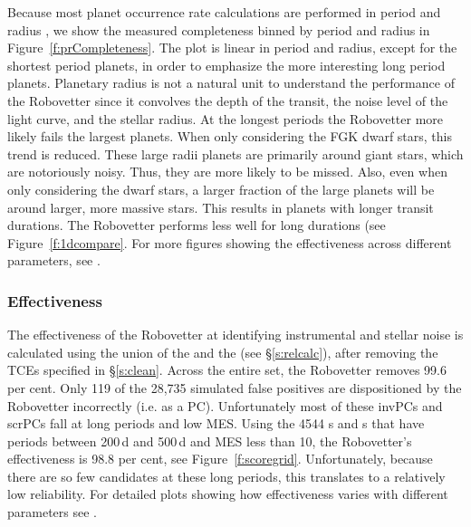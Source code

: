 Because most planet occurrence rate calculations are performed in period and radius \citep[e.g.][]{Burke2015}, we show the measured completeness binned by period and radius in Figure~\ref{f:prCompleteness}. The plot is linear in period and radius, except for the shortest period planets, in order to emphasize the more interesting long period planets. Planetary radius is not a natural unit to understand the performance of the Robovetter since it convolves the depth of the transit, the noise level of the light curve, and the stellar radius.  At the longest periods the Robovetter more likely fails the largest planets.  When only considering the FGK dwarf stars, this trend is reduced.  These large radii planets are primarily around giant stars, which are notoriously noisy. Thus, they are more likely to be missed. Also, even when only considering the dwarf stars, a larger fraction of the large planets will be around larger, more massive stars. This results in planets with longer transit durations. The Robovetter performs less well for long durations (see Figure~\ref{f:1dcompare}. For more figures showing the effectiveness across different parameters, see \citet{Coughlin2017detmetrics}.


\subsubsection{Effectiveness}
The effectiveness of the Robovetter at identifying instrumental and stellar noise is calculated using the union of the  and the  (see \S\ref{s:relcalc}), after removing the TCEs specified in \S\ref{s:clean}. Across the entire set, the Robovetter removes 99.6 per cent.  Only 119 of the 28,735 simulated false positives are dispositioned by the Robovetter incorrectly (i.e. as a PC).  Unfortunately most of these invPCs and scrPCs fall at long periods and low MES.
Using the 4544 \invtce s and \scrtce s that have periods between 200\,d and 500\,d and MES less than 10, the Robovetter's effectiveness is 98.8 per cent, see Figure~\ref{f:scoregrid}.  Unfortunately, because there are so few candidates at these long periods, this translates to a relatively low reliability.  For detailed plots showing how effectiveness varies with different parameters see \citet{Coughlin2017detmetrics}.


